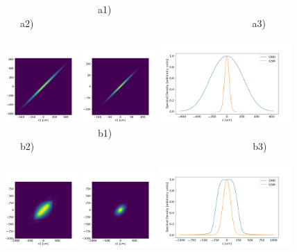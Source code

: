 \documentclass{iopconfser}
\begin{document}
\begin{figure}
    \centering
    ~~~~~~~~~~~~~~~~~~~a1)~~~~~~~~~~~~~~~~~~~~~~~~~~~~~~~~~~~~~~~~~a2)~~~~~~~~~~~~~~~~~~~~~~~~~~~~~~~~~~~~~~~~~~~~~a3)~~~~~~~~~~~~~~~~~~~~~~~~~~~~~~~~~~~~~~~~~\\
    \includegraphics[width=0.25\textwidth]{figures/CMD_H-propagated.png}
    \includegraphics[width=0.25\textwidth]{figures/GSM_H-propagated.png}
    \includegraphics[width=0.45\textwidth]{figures/SD_H-propagated.png}\\
~~~~~~~~~~~~~~~~~~~b1)~~~~~~~~~~~~~~~~~~~~~~~~~~~~~~~~~~~~~~~~~b2)~~~~~~~~~~~~~~~~~~~~~~~~~~~~~~~~~~~~~~~~~~~~~b3)~~~~~~~~~~~~~~~~~~~~~~~~~~~~~~~~~~~~~~~~~\\
    \includegraphics[width=0.25\textwidth]{figures/CMD_V-propagated.png}
    \includegraphics[width=0.25\textwidth]{figures/GSM_V-propagated.png}
    \includegraphics[width=0.45\textwidth]{figures/SD_V-propagated.png}


\end{figure}
\end{document}
